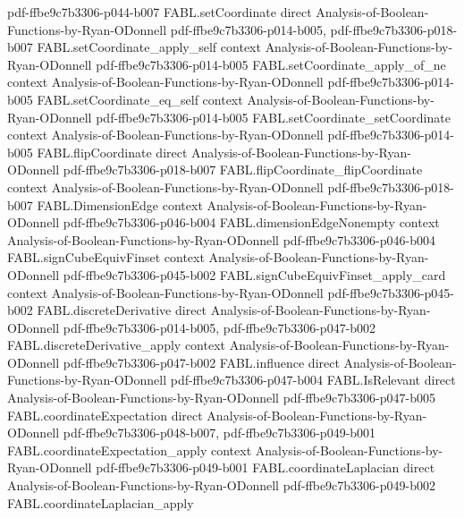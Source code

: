 \begin{theorem}
  {pdf-ffbe9c7b3306-p044-b007}
\proofstep
  {FABL.setCoordinate}
  {direct}
  {Analysis-of-Boolean-Functions-by-Ryan-ODonnell}
  {pdf-ffbe9c7b3306-p014-b005,
    pdf-ffbe9c7b3306-p018-b007}
\proofstep
  {FABL.setCoordinate_apply_self}
  {context}
  {Analysis-of-Boolean-Functions-by-Ryan-ODonnell}
  {pdf-ffbe9c7b3306-p014-b005}
\proofstep
  {FABL.setCoordinate_apply_of_ne}
  {context}
  {Analysis-of-Boolean-Functions-by-Ryan-ODonnell}
  {pdf-ffbe9c7b3306-p014-b005}
\proofstep
  {FABL.setCoordinate_eq_self}
  {context}
  {Analysis-of-Boolean-Functions-by-Ryan-ODonnell}
  {pdf-ffbe9c7b3306-p014-b005}
\proofstep
  {FABL.setCoordinate_setCoordinate}
  {context}
  {Analysis-of-Boolean-Functions-by-Ryan-ODonnell}
  {pdf-ffbe9c7b3306-p014-b005}
\proofstep
  {FABL.flipCoordinate}
  {direct}
  {Analysis-of-Boolean-Functions-by-Ryan-ODonnell}
  {pdf-ffbe9c7b3306-p018-b007}
\proofstep
  {FABL.flipCoordinate_flipCoordinate}
  {context}
  {Analysis-of-Boolean-Functions-by-Ryan-ODonnell}
  {pdf-ffbe9c7b3306-p018-b007}
\proofstep
  {FABL.DimensionEdge}
  {context}
  {Analysis-of-Boolean-Functions-by-Ryan-ODonnell}
  {pdf-ffbe9c7b3306-p046-b004}
\proofstep
  {FABL.dimensionEdgeNonempty}
  {context}
  {Analysis-of-Boolean-Functions-by-Ryan-ODonnell}
  {pdf-ffbe9c7b3306-p046-b004}
\proofstep
  {FABL.signCubeEquivFinset}
  {context}
  {Analysis-of-Boolean-Functions-by-Ryan-ODonnell}
  {pdf-ffbe9c7b3306-p045-b002}
\proofstep
  {FABL.signCubeEquivFinset_apply_card}
  {context}
  {Analysis-of-Boolean-Functions-by-Ryan-ODonnell}
  {pdf-ffbe9c7b3306-p045-b002}
\proofstep
  {FABL.discreteDerivative}
  {direct}
  {Analysis-of-Boolean-Functions-by-Ryan-ODonnell}
  {pdf-ffbe9c7b3306-p014-b005,
    pdf-ffbe9c7b3306-p047-b002}
\proofstep
  {FABL.discreteDerivative_apply}
  {context}
  {Analysis-of-Boolean-Functions-by-Ryan-ODonnell}
  {pdf-ffbe9c7b3306-p047-b002}
\proofstep
  {FABL.influence}
  {direct}
  {Analysis-of-Boolean-Functions-by-Ryan-ODonnell}
  {pdf-ffbe9c7b3306-p047-b004}
\proofstep
  {FABL.IsRelevant}
  {direct}
  {Analysis-of-Boolean-Functions-by-Ryan-ODonnell}
  {pdf-ffbe9c7b3306-p047-b005}
\proofstep
  {FABL.coordinateExpectation}
  {direct}
  {Analysis-of-Boolean-Functions-by-Ryan-ODonnell}
  {pdf-ffbe9c7b3306-p048-b007,
    pdf-ffbe9c7b3306-p049-b001}
\proofstep
  {FABL.coordinateExpectation_apply}
  {context}
  {Analysis-of-Boolean-Functions-by-Ryan-ODonnell}
  {pdf-ffbe9c7b3306-p049-b001}
\proofstep
  {FABL.coordinateLaplacian}
  {direct}
  {Analysis-of-Boolean-Functions-by-Ryan-ODonnell}
  {pdf-ffbe9c7b3306-p049-b002}
\proofstep
  {FABL.coordinateLaplacian_apply}

\end{theorem}
